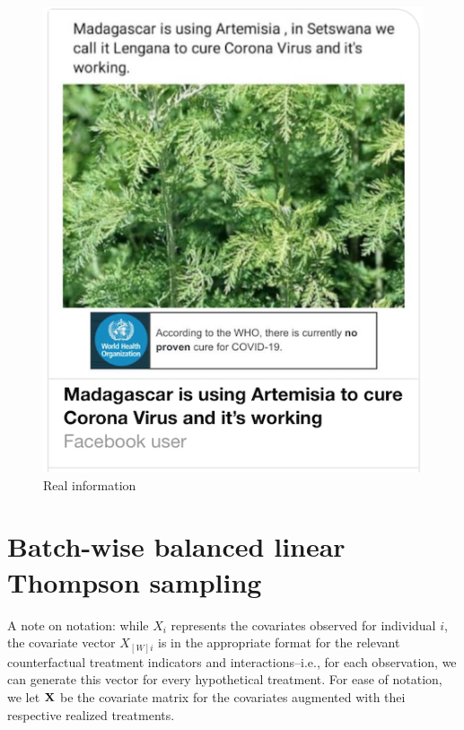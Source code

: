 \documentclass[letterpaper, 12pt, parskip=full,DIV=10]{scrartcl}
\begin{document}
\begin{figure}[htb]
\begin{minipage}{0.45\textwidth}
        \includegraphics[width=\textwidth]{figures/treat_realinfo.png} 
        \caption*{Real information}
    \end{minipage}
\end{figure}

\FloatBarrier
\section{Batch-wise balanced linear Thompson sampling}\label{appendix:agent}

A note on notation: while $X_i$ represents the covariates observed for individual $i$, the covariate vector $X_{[W]i}$ is in the appropriate format for the relevant counterfactual treatment indicators and interactions--i.e., for each observation, we can generate this vector for every hypothetical treatment. For ease of notation, we let $\mathbf{X}$ be the covariate matrix for the covariates augmented with thei respective realized treatments. 
\end{document}
